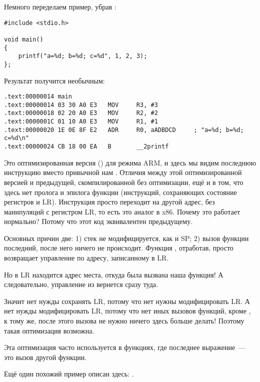 Немного переделаем пример, убрав :

\begin{lstlisting}[style=customc]
#include <stdio.h>

void main()
{
	printf("a=%d; b=%d; c=%d", 1, 2, 3);
};
\end{lstlisting}

Результат получится необычным:

\begin{lstlisting}[caption=\OptimizingKeilVI (\ARMMode),style=customasm]
.text:00000014 main
.text:00000014 03 30 A0 E3   MOV     R3, #3
.text:00000018 02 20 A0 E3   MOV     R2, #2
.text:0000001C 01 10 A0 E3   MOV     R1, #1
.text:00000020 1E 0E 8F E2   ADR     R0, aADBDCD     ; "a=%d; b=%d; c=%d\n"
.text:00000024 CB 18 00 EA   B       __2printf
\end{lstlisting}

Это оптимизированная версия (\Othree) для режима ARM, и здесь мы видим последнюю инструкцию 
 вместо привычной нам .
Отличия между этой оптимизированной версией и предыдущей, скомпилированной без оптимизации, 
ещё и в том, что здесь нет пролога и эпилога функции (инструкций, сохраняющих состояние регистров  и \ac{LR}).
Инструкция  просто переходит на другой адрес, без манипуляций с регистром \ac{LR}, то есть это аналог \JMP в x86.
Почему это работает нормально? Потому что этот код эквивалентен предыдущему.

Основных причин две: 1) стек не модифицируется, как и  \ac{SP}; 2) вызов функции \printf последний, после него ничего не происходит.
Функция \printf, отработав, просто возвращает управление по адресу, записанному в \ac{LR}.

Но в \ac{LR} находится адрес места, откуда была вызвана наша функция!
А следовательно, управление из \printf вернется сразу туда.

Значит нет нужды сохранять \ac{LR}, потому что нет нужны модифицировать \ac{LR}.
А нет нужды модифицировать \ac{LR}, потому что нет иных вызовов функций, кроме \printf, к тому же, после этого вызова не нужно ничего здесь больше делать!
Поэтому такая оптимизация возможна.

Эта оптимизация часто используется в функциях, где последнее выражение~--- это вызов другой функции.

Ещё один похожий пример описан здесь:
.

